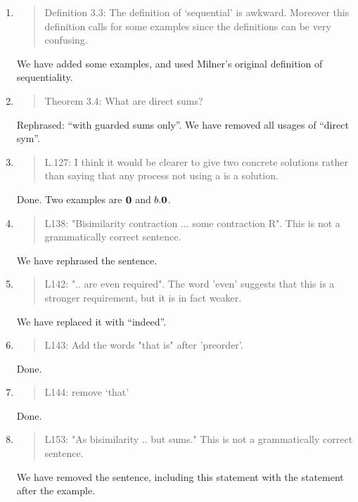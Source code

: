 \begin{enumerate}
\item \begin{quote}
Definition 3.3: The definition of ‘sequential’ is awkward.  Moreover
this definition calls for some examples since the definitions can be
very confusing.
\end{quote}
We have added some examples, and used Milner's original definition of sequentiality.
 
\item \begin{quote}
Theorem 3.4: What are direct sums?
\end{quote}
Rephrased: ``with guarded sums only''. We have removed all usages of
``direct sym''.

\item \begin{quote}
    L.127: I think it would be clearer to give two concrete solutions
    rather than saying that any process not using a is a solution.
  \end{quote}
  Done. Two examples are ${\boldsymbol 0}$ and $b.{\boldsymbol 0}$.
  
\item \begin{quote}
    L138: "Bisimilarity contraction ... some contraction R". This is not a grammatically correct sentence.
  \end{quote}
  We have rephrased the sentence.
  
\item \begin{quote}
    L142: ".. are even required". The word 'even' suggests that this
    is a stronger requirement, but it is in fact weaker.
  \end{quote}
  We have replaced it with ``indeed''.
  
\item \begin{quote}
    L143: Add the words "that is" after 'preorder'.
  \end{quote}
  Done.
  
\item \begin{quote}
    L144: remove ‘that’
  \end{quote}
  Done.
  
\item \begin{quote}
    L153: "As bisimilarity .. but sums." This is not a grammatically correct sentence.
  \end{quote}

  We have removed the sentence, including this statement with the
  statement after the example.
  

\end{enumerate}
